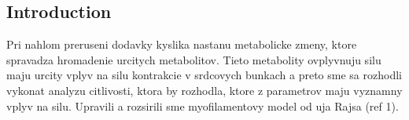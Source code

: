 \documentclass[a0,portrait]{a0poster}
\begin{document}
\vspace{2cm} %


\begin{multicols}{2} %

%
%
%
%


\color{SaddleBrown} %

\section*{Introduction}

Pri nahlom preruseni dodavky kyslika nastanu metabolicke zmeny, ktore
spravadza hromadenie urcitych metabolitov. Tieto metabolity ovplyvnuju
silu maju urcity vplyv na silu kontrakcie v srdcovych bunkach a preto sme
sa rozhodli vykonat analyzu citlivosti, ktora by rozhodla, ktore z
parametrov maju vyznamny vplyv na silu. Upravili a rozsirili sme 
myofilamentovy model od uja Rajsa (ref 1).\\


\end{multicols}
\end{document}
